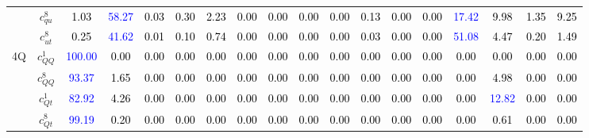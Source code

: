 \documentclass{article}
\begin{document}
\begin{landscape}
\begin{table}[H]
\begin{tabular}{|c|c|c|c|c|c|c|c|c|c|c|c|c|c|c|c|c|c|}
 & $c_{qu}^{8}$ & \textcolor{black}{1.03} & \textcolor{blue}{58.27} & \textcolor{black}{0.03} & \textcolor{black}{0.30} & \textcolor{black}{2.23} & \textcolor{black}{0.00} & \textcolor{black}{0.00} & \textcolor{black}{0.00} & \textcolor{black}{0.00} & \textcolor{black}{0.13} & \textcolor{black}{0.00} & \textcolor{black}{0.00} & \textcolor{blue}{17.42} & \textcolor{black}{9.98} & \textcolor{black}{1.35} & \textcolor{black}{9.25}\\ \cline{2-18}
 & $c_{ut}^{8}$ & \textcolor{black}{0.25} & \textcolor{blue}{41.62} & \textcolor{black}{0.01} & \textcolor{black}{0.10} & \textcolor{black}{0.74} & \textcolor{black}{0.00} & \textcolor{black}{0.00} & \textcolor{black}{0.00} & \textcolor{black}{0.00} & \textcolor{black}{0.03} & \textcolor{black}{0.00} & \textcolor{black}{0.00} & \textcolor{blue}{51.08} & \textcolor{black}{4.47} & \textcolor{black}{0.20} & \textcolor{black}{1.49}\\ \hline
\multirow{5}{*}{4Q}
 & $c_{QQ}^{1}$ & \textcolor{blue}{100.00} & \textcolor{black}{0.00} & \textcolor{black}{0.00} & \textcolor{black}{0.00} & \textcolor{black}{0.00} & \textcolor{black}{0.00} & \textcolor{black}{0.00} & \textcolor{black}{0.00} & \textcolor{black}{0.00} & \textcolor{black}{0.00} & \textcolor{black}{0.00} & \textcolor{black}{0.00} & \textcolor{black}{0.00} & \textcolor{black}{0.00} & \textcolor{black}{0.00} & \textcolor{black}{0.00}\\ \cline{2-18}
 & $c_{QQ}^{8}$ & \textcolor{blue}{93.37} & \textcolor{black}{1.65} & \textcolor{black}{0.00} & \textcolor{black}{0.00} & \textcolor{black}{0.00} & \textcolor{black}{0.00} & \textcolor{black}{0.00} & \textcolor{black}{0.00} & \textcolor{black}{0.00} & \textcolor{black}{0.00} & \textcolor{black}{0.00} & \textcolor{black}{0.00} & \textcolor{black}{0.00} & \textcolor{black}{4.98} & \textcolor{black}{0.00} & \textcolor{black}{0.00}\\ \cline{2-18}
 & $c_{Qt}^{1}$ & \textcolor{blue}{82.92} & \textcolor{black}{4.26} & \textcolor{black}{0.00} & \textcolor{black}{0.00} & \textcolor{black}{0.00} & \textcolor{black}{0.00} & \textcolor{black}{0.00} & \textcolor{black}{0.00} & \textcolor{black}{0.00} & \textcolor{black}{0.00} & \textcolor{black}{0.00} & \textcolor{black}{0.00} & \textcolor{black}{0.00} & \textcolor{blue}{12.82} & \textcolor{black}{0.00} & \textcolor{black}{0.00}\\ \cline{2-18}
 & $c_{Qt}^{8}$ & \textcolor{blue}{99.19} & \textcolor{black}{0.20} & \textcolor{black}{0.00} & \textcolor{black}{0.00} & \textcolor{black}{0.00} & \textcolor{black}{0.00} & \textcolor{black}{0.00} & \textcolor{black}{0.00} & \textcolor{black}{0.00} & \textcolor{black}{0.00} & \textcolor{black}{0.00} & \textcolor{black}{0.00} & \textcolor{black}{0.00} & \textcolor{black}{0.61} & \textcolor{black}{0.00} & \textcolor{black}{0.00}\\ \cline{2-18}

\end{tabular}
\end{table}
\end{landscape}
\end{document}
